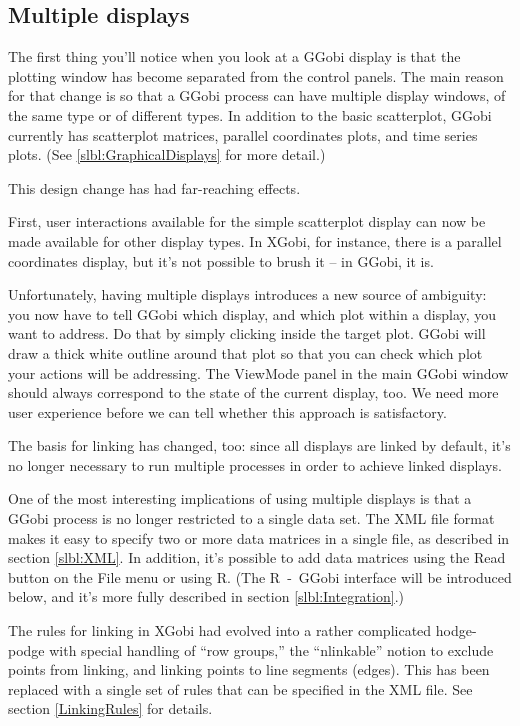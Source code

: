 \documentclass[11pt]{article}
\begin{document}
\subsection {Multiple displays}

The first thing you'll notice when you look at a GGobi display is
that the plotting window has become separated from the control
panels.  The main reason for that change is so that a GGobi process
can have multiple display windows, of the same type or of different
types.  In addition to the basic scatterplot, GGobi currently has
scatterplot matrices, parallel coordinates plots, and time series
plots.  (See \ref{slbl:GraphicalDisplays} for more detail.)

This design change has had far-reaching effects.

First, user interactions available for the simple scatterplot display
can now be made available for other display types.  In XGobi, for
instance, there is a parallel coordinates display, but it's not
possible to brush it -- in GGobi, it is.

Unfortunately, having multiple displays introduces a new source of
ambiguity: you now have to tell GGobi which display, and which plot
within a display, you want to address.  Do that by simply clicking
inside the target plot.  GGobi will draw a thick white outline around
that plot so that you can check which plot your actions will be
addressing.  The ViewMode panel in the main GGobi window should
always correspond to the state of the current display, too.  We need
more user experience before we can tell whether this approach is
satisfactory.

The basis for linking has changed, too:  since all displays are
linked by default, it's no longer necessary to run multiple processes
in order to achieve linked displays.

One of the most interesting implications of using multiple displays
is that a GGobi process is no longer restricted to a single data
set.  The XML file format makes it easy to specify two or more data
matrices in a single file, as described in section \ref{slbl:XML}.
In addition, it's possible to add data matrices using the Read button
on the File menu or using R.  (The R~-~GGobi interface will be
introduced below, and it's more fully described in section
\ref{slbl:Integration}.)

The rules for linking in XGobi had evolved into a rather complicated
hodge-podge with special handling of ``row groups,'' the
``nlinkable'' notion to exclude points from linking, and linking
points to line segments (edges).  This has been replaced with a single set
of rules that can be specified in the XML file.  See section 
\ref{LinkingRules} for details.
\end{document}
